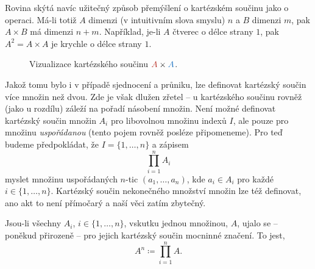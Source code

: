 Rovina skýtá navíc užitečný způsob přemýšlení o kartézském součinu jako o
 operaci. Má-li totiž $A$ dimenzi (v intuitivním slova smyslu)
$n$ a $B$ dimenzi $m$, pak $A \times B$ má dimenzi $n + m$. Například, je-li $A$
čtverec o délce strany $1$, pak $A^2 = A \times A$ je krychle o délce strany
$1$.

\begin{figure}[ht]
 \centering

 \caption{Vizualizace kartézského součinu $\clr{A} \times \clb{A}$.}
 \label{fig:kartezsky-soucin}
\end{figure}

Jakož tomu bylo i v případě sjednocení a průniku, lze definovat kartézský součin
více množin než dvou. Zde je však dlužen zřetel -- u kartézského součinu rovněž
(jako u rozdílu) záleží na pořadí násobení množin. Není možné definovat
kartézský součin množin $A_i$ pro libovolnou množinu indexů $I$, ale pouze pro
množinu \emph{uspořádanou} (tento pojem rovněž posléze připomeneme). Pro teď
budeme předpokládat, že $I = \{1,\ldots,n\}$ a zápisem
\[
 \prod_{i=1}^n A_i
\]
myslet množinu uspořádaných $n$-tic $(a_1,\ldots,a_n)$, kde $a_i \in A_i$ pro
každé $i \in \{1,\ldots,n\}$. Kartézský součin nekonečného množství množin lze
též definovat, ano akt to není přímočarý a naší věci zatím zbytečný.

Jsou-li všechny $A_i$, $i \in \{1,\ldots,n\}$, vskutku jednou množinou, $A$,
ujalo se -- poněkud přirozeně -- pro jejich kartézský součin mocninné značení.
To jest,
\[
 A^{n} \coloneqq \prod_{i = 1}^{n} A.
\]
